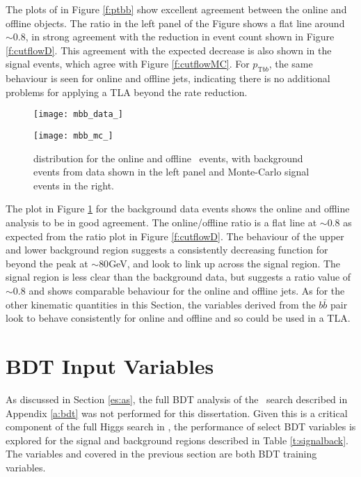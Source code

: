         The plots of \ptbb in Figure \ref{f:ptbb} show excellent agreement between the online and offline objects. The ratio in the left panel of the Figure shows a flat line around $\sim0.8$, in strong agreement with the reduction in event count shown in Figure \ref{f:cutflowD}. This agreement with the expected decrease is also shown in the signal events, which agree with Figure \ref{f:cutflowMC}. For $p_{\text{T}bb}$, the same behaviour is seen for online and offline jets, indicating there is no additional problems for applying a TLA beyond the rate reduction.

        \begin{figure}[h]
            \centering
            \begin{minipage}[h]{0.48\linewidth}
                \texttt{[image: mbb\_data\_]}
            \end{minipage}
            \quad
            \begin{minipage}[h]{0.48\linewidth}
                \texttt{[image: mbb\_mc\_]}
            \end{minipage}
            \caption[Comparison of the \mbb distribution of the \VBFHBB\ events for HLT and offline objects]{\mbb distribution for the online and offline \VBFHBB\ events, with background events from data shown in the left panel and Monte-Carlo signal events in the right.}
            \label{f:mbb}
        \end{figure}

        The \mbb plot in Figure \ref{f:mbb} for the background data events shows the online and offline analysis to be in good agreement. The online/offline ratio is a flat line at $\sim0.8$ as expected from the ratio plot in Figure \ref{f:cutflowD}. The behaviour of the upper and lower background region suggests a consistently decreasing function for \mbb beyond the peak at \pt$\sim80$GeV, and look to link up across the signal region. The signal region is less clear than the background data, but suggests a ratio value of $\sim0.8$ and shows comparable behaviour for the online and offline jets. As for the other kinematic quantities in this Section, the variables derived from the $b\bar{b}$ pair look to behave consistently for online and offline and so could be used in a TLA.
\section{BDT Input Variables}

    As discussed in Section \ref{es:as}, the full BDT analysis of the \VBFHBB\ search described in Appendix \ref{a:bdt} was not performed for this dissertation. Given this is a critical component of the full Higgs search \cite{VBFHbb8tev} in \VBFHBB, the performance of select BDT variables is explored for the signal and background regions described in Table \ref{t:signalback}. The variables \mjj and \ptjj covered in the previous section are both BDT training variables.

